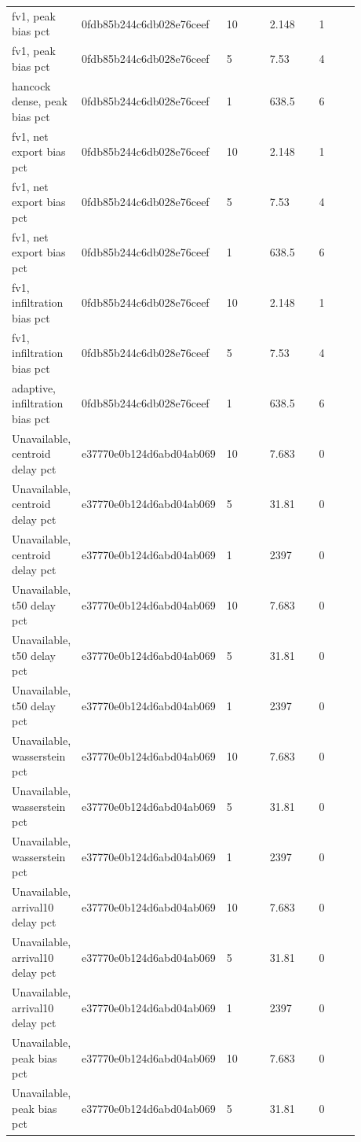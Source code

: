 \begin{longtable}{p{0.1760\linewidth}p{0.1760\linewidth}p{0.1760\linewidth}p{0.1760\linewidth}p{0.1760\linewidth}}
fv1, peak bias pct & 0fdb85b244c6db028e76ceef & 10 & 2.148 & 1 \\
fv1, peak bias pct & 0fdb85b244c6db028e76ceef & 5 & 7.53 & 4 \\
hancock dense, peak bias pct & 0fdb85b244c6db028e76ceef & 1 & 638.5 & 6 \\
fv1, net export bias pct & 0fdb85b244c6db028e76ceef & 10 & 2.148 & 1 \\
fv1, net export bias pct & 0fdb85b244c6db028e76ceef & 5 & 7.53 & 4 \\
fv1, net export bias pct & 0fdb85b244c6db028e76ceef & 1 & 638.5 & 6 \\
fv1, infiltration bias pct & 0fdb85b244c6db028e76ceef & 10 & 2.148 & 1 \\
fv1, infiltration bias pct & 0fdb85b244c6db028e76ceef & 5 & 7.53 & 4 \\
adaptive, infiltration bias pct & 0fdb85b244c6db028e76ceef & 1 & 638.5 & 6 \\
Unavailable, centroid delay pct & e37770e0b124d6abd04ab069 & 10 & 7.683 & 0 \\
Unavailable, centroid delay pct & e37770e0b124d6abd04ab069 & 5 & 31.81 & 0 \\
Unavailable, centroid delay pct & e37770e0b124d6abd04ab069 & 1 & 2397 & 0 \\
Unavailable, t50 delay pct & e37770e0b124d6abd04ab069 & 10 & 7.683 & 0 \\
Unavailable, t50 delay pct & e37770e0b124d6abd04ab069 & 5 & 31.81 & 0 \\
Unavailable, t50 delay pct & e37770e0b124d6abd04ab069 & 1 & 2397 & 0 \\
Unavailable, wasserstein pct & e37770e0b124d6abd04ab069 & 10 & 7.683 & 0 \\
Unavailable, wasserstein pct & e37770e0b124d6abd04ab069 & 5 & 31.81 & 0 \\
Unavailable, wasserstein pct & e37770e0b124d6abd04ab069 & 1 & 2397 & 0 \\
Unavailable, arrival10 delay pct & e37770e0b124d6abd04ab069 & 10 & 7.683 & 0 \\
Unavailable, arrival10 delay pct & e37770e0b124d6abd04ab069 & 5 & 31.81 & 0 \\
Unavailable, arrival10 delay pct & e37770e0b124d6abd04ab069 & 1 & 2397 & 0 \\
Unavailable, peak bias pct & e37770e0b124d6abd04ab069 & 10 & 7.683 & 0 \\
Unavailable, peak bias pct & e37770e0b124d6abd04ab069 & 5 & 31.81 & 0 \\

\end{longtable}
